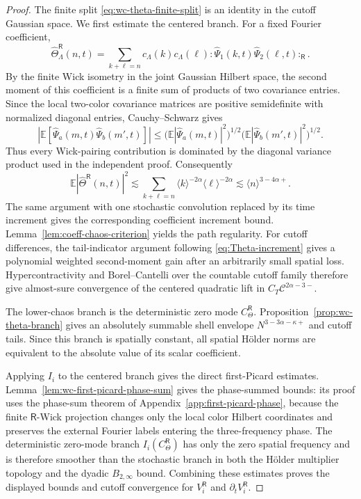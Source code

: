 \documentclass[10pt]{amsart}
\numberwithin{equation}{section}
\theoremstyle{plain}
\theoremstyle{definition}
\theoremstyle{remark}
\newcommand{\E}{\mathbb{E}}
\begin{document}
\begin{proof}
The finite split \eqref{eq:wc-theta-finite-split} is an identity in the cutoff Gaussian space.  We first estimate the centered branch.  For a fixed Fourier coefficient,
\[
        \widehat\Theta_{\Lambda}^{\mathsf R}(n,t)
        =\sum_{k+\ell=n}c_\Lambda(k)c_\Lambda(\ell)
        :\widehat\Psi_1(k,t)\widehat\Psi_2(\ell,t):_{\mathsf R}.
\]
By the finite Wick isometry in the joint Gaussian Hilbert space, the second moment of this coefficient is a finite sum of products of two covariance entries.  Since the local two-color covariance matrices are positive semidefinite with normalized diagonal entries, Cauchy--Schwarz gives
\[
        |\E[\widehat\Psi_a(m,t)\widehat\Psi_b(m',t)]|
        \le
        \bigl(\E|\widehat\Psi_a(m,t)|^2\bigr)^{1/2}
        \bigl(\E|\widehat\Psi_b(m',t)|^2\bigr)^{1/2}.
\]
Thus every Wick-pairing contribution is dominated by the diagonal variance product used in the independent proof.  Consequently
\[
        \E|\widehat\Theta^{\mathsf R}(n,t)|^2
        \lesssim \sum_{k+\ell=n}\langle k\rangle^{-2\alpha}\langle \ell\rangle^{-2\alpha}
        \lesssim \langle n\rangle^{3-4\alpha+}.
\]
The same argument with one stochastic convolution replaced by its time increment gives the corresponding coefficient increment bound.  Lemma~\ref{lem:coeff-chaos-criterion} yields the path regularity.  For cutoff differences, the tail-indicator argument following \eqref{eq:Theta-increment} gives a polynomial weighted second-moment gain after an arbitrarily small spatial loss.  Hypercontractivity and Borel--Cantelli over the countable cutoff family therefore give almost-sure convergence of the centered quadratic lift in $C_T\mathcal C^{2\alpha-3-}$.

The lower-chaos branch is the deterministic zero mode $C_\Theta^{\mathsf R}$.  Proposition~\ref{prop:wc-theta-branch} gives an absolutely summable shell envelope $N^{3-3\alpha-\kappa+}$ and cutoff tails.  Since this branch is spatially constant, all spatial H\"older norms are equivalent to the absolute value of its scalar coefficient.

Applying $I_i$ to the centered branch gives the direct first-Picard estimates.  Lemma~\ref{lem:wc-first-picard-phase-sum} gives the phase-summed bounds: its proof uses the phase-sum theorem of Appendix~\ref{app:first-picard-phase}, because the finite $\mathsf R$-Wick projection changes only the local color Hilbert coordinates and preserves the external Fourier labels entering the three-frequency phase.  The deterministic zero-mode branch $I_i(C_\Theta^{\mathsf R})$ has only the zero spatial frequency and is therefore smoother than the stochastic branch in both the H\"older multiplier topology and the dyadic $B_{2,\infty}$ bound.  Combining these estimates proves the displayed bounds and cutoff convergence for $V_i^{\mathsf R}$ and $\partial_tV_i^{\mathsf R}$.
\end{proof}
\end{document}
